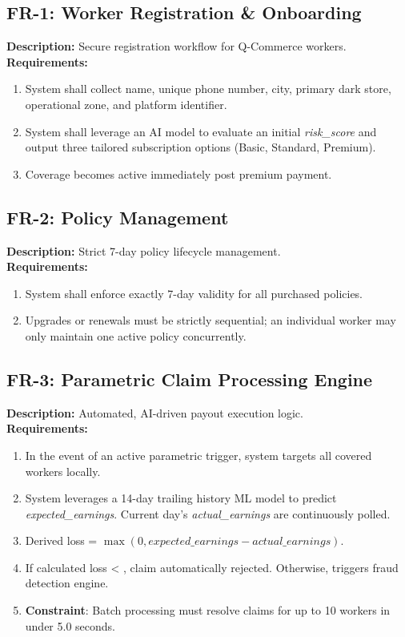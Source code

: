 \documentclass[12pt,a4paper]{article}
\begin{document}
\subsection{FR-1: Worker Registration \& Onboarding}
\textbf{Description:} Secure registration workflow for Q-Commerce workers.\\
\textbf{Requirements:}
\begin{enumerate}
    \item System shall collect name, unique phone number, city, primary dark store, operational zone, and platform identifier.
    \item System shall leverage an AI model to evaluate an initial \textit{risk\_score} and output three tailored subscription options (Basic, Standard, Premium).
    \item Coverage becomes active immediately post premium payment.
\end{enumerate}

\subsection{FR-2: Policy Management}
\textbf{Description:} Strict 7-day policy lifecycle management.\\
\textbf{Requirements:}
\begin{enumerate}
    \item System shall enforce exactly 7-day validity for all purchased policies.
    \item Upgrades or renewals must be strictly sequential; an individual worker may only maintain one active policy concurrently.
\end{enumerate}

\subsection{FR-3: Parametric Claim Processing Engine}
\textbf{Description:} Automated, AI-driven payout execution logic.\\
\textbf{Requirements:}
\begin{enumerate}
    \item In the event of an active parametric trigger, system targets all covered workers locally.
    \item System leverages a 14-day trailing history ML model to predict \textit{expected\_earnings}. Current day's \textit{actual\_earnings} are continuously polled.
    \item Derived loss = $\max(0, expected\_earnings - actual\_earnings)$.
    \item If calculated loss < , claim automatically rejected. Otherwise, triggers fraud detection engine.
    \item \textbf{Constraint}: Batch processing must resolve claims for up to 10 workers in under 5.0 seconds.
\end{enumerate}
\end{document}
